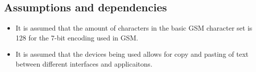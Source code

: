 \subsection{Assumptions and dependencies}

\begin{itemize}
\item It is assumed that the amount of characters in the basic GSM character set is 128 for the 7-bit encoding used in GSM.
\item It is assumed that the devices being used allows for copy and pasting of text between different interfaces and applicaitons.
\end{itemize}
